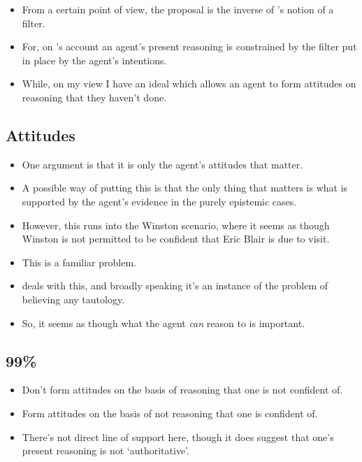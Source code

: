 \documentclass[10pt]{article}
\begin{document}
\begin{itemize}
\item From a certain point of view, the proposal is the inverse of \citeauthor{Bratman:1987aa}'s notion of a filter.
\item For, on \citeauthor{Bratman:1987aa}'s account an agent's present reasoning is constrained by the filter put in place by the agent's intentions.
\item While, on my view I have an ideal which allows an agent to form attitudes on reasoning that they haven't done.
\end{itemize}

\subsection{Attitudes}
\label{sec:attitudes}

\begin{itemize}
\item One argument is that it is only the agent's attitudes that matter.
\item A possible way of putting this is that the only thing that matters is what is supported by the agent's evidence in the purely epistemic cases.
\item However, this runs into the Winston scenario, where it seems as though Winston is not permitted to be confident that Eric Blair is due to visit.
\item This is a familiar problem.
\item \citeauthor{Lord:2018aa} deals with this, and broadly speaking it's an instance of the problem of believing any tautology.
\item So, it seems as though what the agent \emph{can} reason to is important.
\end{itemize}

\subsection{99\%}
\label{sec:99}

\begin{itemize}
\item Don't form attitudes on the basis of reasoning that one is not confident of.
\item Form attitudes on the basis of not reasoning that one is confident of.
\item There's not direct line of support here, though it does suggest that one's present reasoning is not `authoritative'.
\end{itemize}
\end{document}
